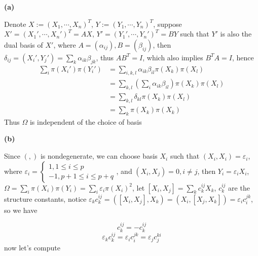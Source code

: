 \documentclass[main]{subfiles}
\begin{document}
\textbf{(a)} \par
Denote $X:=(X_1,\cdots,X_n)^T$, $Y:=(Y_1,\cdots,Y_n)^T$, suppose $X'=(X_1',\cdots,X_n')^T=AX$, $Y'=(Y_1',\cdots,Y_n')^T=BY$ such that $Y'$ is also the dual basis of $X'$, where $A=(\alpha_{ij}),B=(\beta_{ij})$, then $\delta_{ij}=(X_i',Y_j')=\displaystyle\sum_{k}\alpha_{ik}\beta_{jk}$, thus $AB^T=I$, which also implies $B^TA=I$, hence 
\begin{align*}
\displaystyle\sum_{i}\pi(X_i')\pi(Y_i')&=\sum_{i,k,l}\alpha_{ik}\beta_{il}\pi(X_k)\pi(X_l) \\
&=\sum_{k,l}\left(\sum_{i}\alpha_{ik}\beta_{il}\right)\pi(X_k)\pi(X_l) \\
&=\sum_{k,l}\delta_{kl}\pi(X_k)\pi(X_l) \\
&=\sum_{k}\pi(X_k)\pi(X_k)
\end{align*}
Thus $\Omega$ is independent of the choice of basis \par
\textbf{(b)} \par
Since $(,)$ is nondegenerate, we can choose basis $X_i$ such that $(X_i,X_i)=\varepsilon_i$, where $\varepsilon_i=\begin{cases}
1, 1\leq i\leq p \\
-1, p+1\leq i\leq p+q
\end{cases}$, and $(X_i,X_j)=0,i\neq j$, then $Y_i=\varepsilon_i X_i$, $\Omega=\displaystyle\sum_i\pi(X_i)\pi(Y_i)=\sum_i\varepsilon_i\pi(X_i)^2$, let $[X_i,X_j]=\displaystyle\sum_k c^{ij}_kX_k$, $c^{ij}_k$ are the structure constants, notice $\varepsilon_kc_k^{ij}=([X_i,X_j],X_k)=(X_i,[X_j,X_k])=\varepsilon_ic_i^{jk}$, so we have \par
\begin{equation}
c_k^{ij}=-c_k^{ij}
\end{equation}
\begin{equation}
\varepsilon_kc_k^{ij}=\varepsilon_ic_i^{jk}=\varepsilon_jc_j^{ki}
\end{equation}
now let's compute \par
\end{document}
